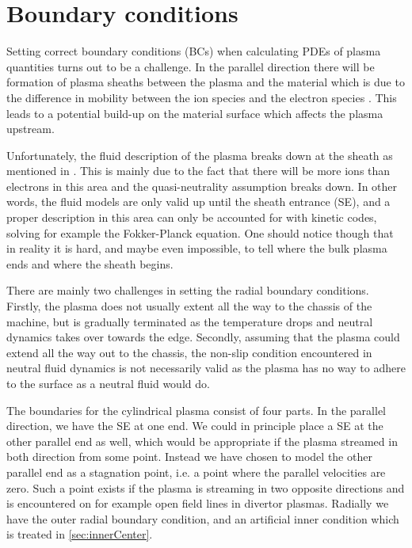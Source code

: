 \section{Boundary conditions}
\label{sec:BCs}
%
Setting correct boundary conditions (BCs) when calculating PDEs of plasma quantities turns out to be a challenge.
In the parallel direction there will be formation of plasma sheaths between the plasma and the material which is due to the difference in mobility between the ion species and the electron species \cite{Stangeby2000book}.
This leads to a potential build-up on the material surface which affects the plasma upstream.

Unfortunately, the fluid description of the plasma breaks down at the sheath as mentioned in \cite{Loizu2012a}.
This is mainly due to the fact that there will be more ions than electrons in this area and the quasi-neutrality assumption breaks down.
In other words, the fluid models are only valid up until the sheath entrance (SE), and a proper description in this area can only be accounted for with kinetic codes, solving for example the Fokker-Planck equation.
One should notice though that in reality it is hard, and maybe even impossible, to tell where the bulk plasma ends and where the sheath begins.

There are mainly two challenges in setting the radial boundary conditions.
Firstly, the plasma does not usually extent all the way to the chassis of the machine, but is gradually terminated as the temperature drops and neutral dynamics takes over towards the edge.
Secondly, assuming that the plasma could extend all the way out to the chassis, the non-slip condition encountered in neutral fluid dynamics \cite{Kundu2010book} is not necessarily valid as the plasma has no way to adhere to the surface as a neutral fluid would do.

The boundaries for the cylindrical plasma consist of four parts.
In the parallel direction, we have the SE at one end.
We could in principle place a SE at the other parallel end as well, which would be appropriate if the plasma streamed in both direction from some point.
Instead we have chosen to model the other parallel end as a stagnation point, i.e. a point where the parallel velocities are zero.
Such a point exists if the plasma is streaming in two opposite directions and is encountered on for example open field lines in divertor plasmas.
Radially we have the outer radial boundary condition, and an artificial inner condition which is treated in \cref{sec:innerCenter}.

